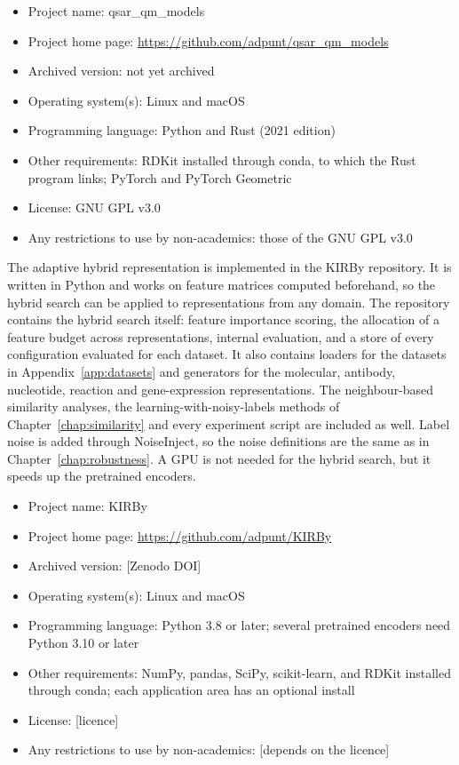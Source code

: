 \begin{itemize}
    \item Project name: qsar\_qm\_models
    \item Project home page: \url{https://github.com/adpunt/qsar_qm_models}
    \item Archived version: not yet archived
    \item Operating system(s): Linux and macOS
    \item Programming language: Python and Rust (2021 edition)
    \item Other requirements: RDKit installed through conda, to which the Rust program links; PyTorch and PyTorch Geometric
    \item License: GNU GPL v3.0
    \item Any restrictions to use by non-academics: those of the GNU GPL v3.0
\end{itemize}

The adaptive hybrid representation is implemented in the KIRBy repository. It is written in Python and works on feature matrices computed beforehand, so the hybrid search can be applied to representations from any domain. The repository contains the hybrid search itself: feature importance scoring, the allocation of a feature budget across representations, internal evaluation, and a store of every configuration evaluated for each dataset. It also contains loaders for the datasets in Appendix~\ref{app:datasets} and generators for the molecular, antibody, nucleotide, reaction and gene-expression representations. The neighbour-based similarity analyses, the learning-with-noisy-labels methods of Chapter~\ref{chap:similarity} and every experiment script are included as well. Label noise is added through NoiseInject, so the noise definitions are the same as in Chapter~\ref{chap:robustness}. A GPU is not needed for the hybrid search, but it speeds up the pretrained encoders.

\begin{itemize}
    \item Project name: KIRBy
    \item Project home page: \url{https://github.com/adpunt/KIRBy}
    \item Archived version: [Zenodo DOI]
    \item Operating system(s): Linux and macOS
    \item Programming language: Python 3.8 or later; several pretrained encoders need Python 3.10 or later
    \item Other requirements: NumPy, pandas, SciPy, scikit-learn, and RDKit installed through conda; each application area has an optional install
    \item License: [licence]
    \item Any restrictions to use by non-academics: [depends on the licence]
\end{itemize}


